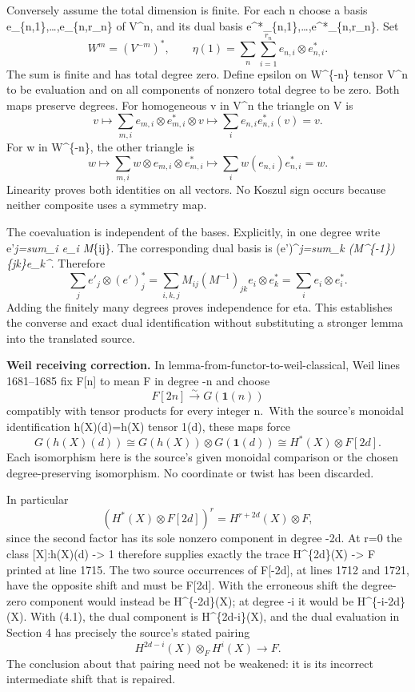 \documentclass[11pt]{article}
\begin{document}
Conversely assume the total dimension is finite. For each n choose a basis e\_\{n,1\},\ldots,e\_\{n,r\_n\} of V\^{}n, and its dual basis e\^{}*\_\{n,1\},\ldots,e\^{}*\_\{n,r\_n\}. Set \[
W^m=(V^{-m})^*,\qquad
\eta(1)=\sum_n\sum_{i=1}^{r_n}e_{n,i}\otimes e^*_{n,i}.
\] The sum is finite and has total degree zero. Define epsilon on W\^{}\{-n\} tensor V\^{}n to be evaluation and on all components of nonzero total degree to be zero. Both maps preserve degrees. For homogeneous v in V\^{}n the triangle on V is \[
v\longmapsto
\sum_{m,i}e_{m,i}\otimes e^*_{m,i}\otimes v
\longmapsto
\sum_i e_{n,i}e^*_{n,i}(v)=v.
\] For w in W\^{}\{-n\}, the other triangle is \[
w\longmapsto
\sum_{m,i}w\otimes e_{m,i}\otimes e^*_{m,i}
\longmapsto
\sum_i w(e_{n,i})e^*_{n,i}=w.
\] Linearity proves both identities on all vectors. No Koszul sign occurs because neither composite uses a symmetry map.

The coevaluation is independent of the bases. Explicitly, in one degree write e'\emph{j=sum\_i e\_i M}\{ij\}. The corresponding dual basis is (e')\^{}\emph{\emph{j=sum\_k (M\^{}\{-1\})}\{jk\}e\_k\^{}}. Therefore \[
\sum_j e'_j\otimes(e')^*_j
=\sum_{i,k,j}M_{ij}(M^{-1})_{jk}e_i\otimes e_k^*
=\sum_i e_i\otimes e_i^*.
\] Adding the finitely many degrees proves independence for eta. This establishes the converse and exact dual identification without substituting a stronger lemma into the translated source.

\textbf{Weil receiving correction.} In lemma-from-functor-to-weil-classical, Weil lines 1681--1685 fix F{[}n{]} to mean F in degree -n and choose \[
F[2n]\xrightarrow{\sim}G(\mathbf1(n))
\] compatibly with tensor products for every integer n.~With the source's monoidal identification h(X)(d)=h(X) tensor 1(d), these maps force \[
G(h(X)(d))
\cong G(h(X))\otimes G(\mathbf1(d))
\cong H^*(X)\otimes F[2d].                                \tag{4.1}
\] Each isomorphism here is the source's given monoidal comparison or the chosen degree-preserving isomorphism. No coordinate or twist has been discarded.

In particular \[
(H^*(X)\otimes F[2d])^r
 = H^{r+2d}(X)\otimes F,
\] since the second factor has its sole nonzero component in degree -2d. At r=0 the class {[}X{]}:h(X)(d) -\textgreater{} 1 therefore supplies exactly the trace H\^{}\{2d\}(X) -\textgreater{} F printed at line 1715. The two source occurrences of F{[}-2d{]}, at lines 1712 and 1721, have the opposite shift and must be F{[}2d{]}. With the erroneous shift the degree-zero component would instead be H\^{}\{-2d\}(X); at degree -i it would be H\^{}\{-i-2d\}(X). With (4.1), the dual component is H\^{}\{2d-i\}(X), and the dual evaluation in Section 4 has precisely the source's stated pairing \[
H^{2d-i}(X)\otimes_F H^i(X)\longrightarrow F.
\] The conclusion about that pairing need not be weakened: it is its incorrect intermediate shift that is repaired.
\end{document}
